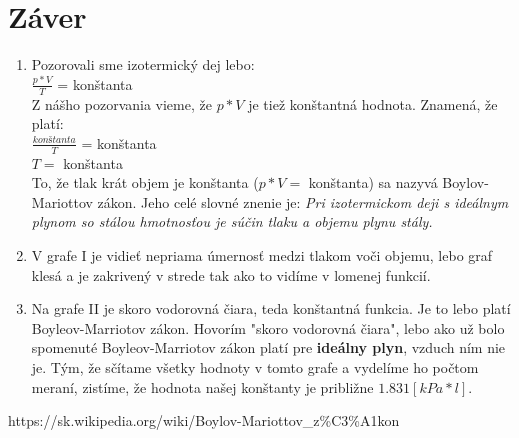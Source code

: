 \documentclass[12pt]{extarticle}
\begin{document}
\section{Záver}
\begin{enumerate}
\item Pozorovali sme izotermický dej lebo: \\[1em]
$\frac{p * V}{T}$ = konštanta\\[1em]
Z nášho pozorvania vieme, že $p * V$ je tiež konštantná hodnota. Znamená, že platí: \\[1em]
$\frac{konštanta}{T}$ = konštanta\\
$T =$ konštanta\\[1em]
To, že tlak krát objem je konštanta ($p* V =$ konštanta) sa nazyvá Boylov-Mariottov zákon. Jeho celé slovné znenie je: \textit{Pri izotermickom deji s ideálnym plynom so stálou hmotnosťou je súčin tlaku a objemu plynu stály.} \cite{zakon}
\item
V grafe I je vidieť nepriama úmernosť medzi tlakom voči objemu, lebo graf klesá a je zakrivený v strede tak ako to vidíme v lomenej funkcií.
\item Na grafe II je skoro vodorovná čiara, teda konštantná funkcia.
Je to lebo platí Boyleov-Marriotov zákon. Hovorím "skoro vodorovná čiara", lebo ako už bolo spomenuté Boyleov-Marriotov zákon platí pre \textbf{ideálny plyn}, vzduch ním nie je.
Tým, že sčítame všetky hodnoty v tomto grafe a vydelíme ho počtom meraní, zistíme, že hodnota našej konštanty je približne $1.831[kPa * l]$.
\end{enumerate}

\begin{thebibliography}{3}
	https://sk.wikipedia.org/wiki/Boylov-Mariottov\_z\%C3\%A1kon
\end{thebibliography}
\end{document}

